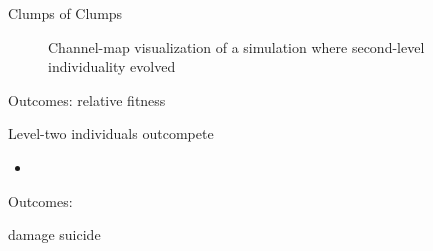\begin{frame}{Clumps of Clumps}
\begin{figure}
\begin{columns}
\begin{column}{0.6\textwidth}
\end{column}
\begin{column}{0.4\textwidth}
%
%
%
%
%
%
%

\vspace{8ex}

\caption{Channel-map visualization of a simulation where second-level individuality evolved}
\end{column}
\end{columns}
\end{figure}
\end{frame}

\begin{frame}{Outcomes: relative fitness}

Level-two individuals outcompete

\begin{itemize}

\item

\end{itemize}

\end{frame}


\begin{frame}{Outcomes: }

damage suicide

\end{frame}
